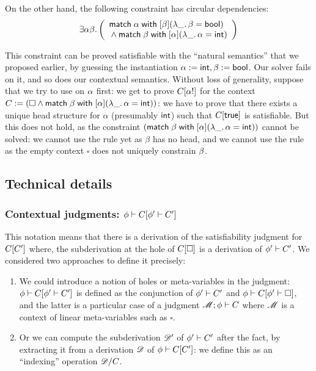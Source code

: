 \documentclass[acmsmall,screen,nonacm]{acmart}
\begin{document}
On the other hand, the following constraint has circular dependencies:
$$
  \exists \alpha \beta.
  \left(\begin{array}{l}
    \mathopen{}\mathrel{\mathsf{match}} \alpha \mathrel{\mathsf{with}} [ \beta ] (\lambda {{\_}}. \,{\beta = \mathsf{bool}}) \\
    {} \wedge \mathopen{}\mathrel{\mathsf{match}} \beta \mathrel{\mathsf{with}} [ \alpha ] (\lambda {{\_}}. \,{\alpha = \mathsf{int}})
  \end{array}\right)
$$

This constraint can be proved satisfiable with the ``natural semantics''
that we proposed earlier, by guessing the instantiation $\alpha := \mathsf{int}, \beta
:= \mathsf{bool}$. Our solver fails on it, and so does our contextual
semantics. Without loss of generality, suppose that we try to use
 on $\alpha$ first: we get to prove $C[\alpha !]$ for the
context $C := (\square \wedge \mathopen{}\mathrel{\mathsf{match}} \beta \mathrel{\mathsf{with}} [ \alpha ] (\lambda {{\_}}. \,{\alpha =
\mathsf{int}}))$: we have to prove that there exists a unique head structure for
$\alpha$ (presumably $\mathsf{int}$) such that $C[\mathsf{true}]$ is satisfiable. But
this does not hold, as the constraint $(\mathopen{}\mathrel{\mathsf{match}} \beta \mathrel{\mathsf{with}} [ \alpha ] (\lambda {{\_}}. \,{\alpha = \mathsf{int}}))$ cannot be solved: we cannot use the  rule
yet as $\beta$ has no head, and we cannot use the  rule as
the empty context $\square$ does not uniquely constrain $\beta$.

\subsection{Technical details}

\subsubsection{Contextual judgments: $\phi \vdash C[\phi' \vdash C']$}\label{par:contextual-judgments}

This notation means that there is a derivation of the satisfiability
judgment for $C[C']$ where, the subderivation at the hole of
$C[\square]$ is a derivation of $\phi' \vdash C'$. We considered
two approaches to define it precisely:
\begin{enumerate}
\item We could introduce a notion of holes or meta-variables in the
  judgment: $\phi \vdash C[\phi' \vdash C']$ is defined as the
  conjunction of $\phi' \vdash C'$ and
  $\phi \vdash C[\phi' \vdash \square]$, and the latter is
  a particular case of a judgment $\mathscr{M}; \phi \vdash C$
  where $\mathscr{M}$ is a context of linear meta-variables such as
  $\square$.
\item Or we can compute the subderivation $\mathscr{D}'$ of
  $\phi' \vdash C'$ after the fact, by extracting it from
  a derivation $\mathscr{D}$ of $\phi \vdash C[C']$: we define this as
  an ``indexing'' operation ${\mathscr{D}}/{C}$.
\end{enumerate}
\end{document}
